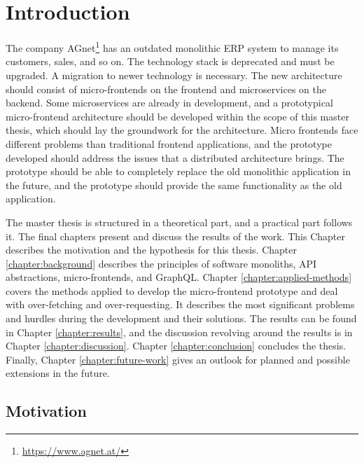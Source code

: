 \chapter{Introduction}\label{chapter:introduction}

The company AGnet\footnote{\url{https://www.agnet.at/}} has an outdated monolithic \ac{ERP} system to manage its customers, sales, and so on. The technology stack is deprecated and must be upgraded. A migration to newer technology is necessary. The new architecture should consist of micro-frontends on the frontend and microservices on the backend. Some microservices are already in development, and a prototypical micro-frontend architecture should be developed within the scope of this master thesis, which should lay the groundwork for the architecture. Micro frontends face different problems than traditional frontend applications, and the prototype developed should address the issues that a distributed architecture brings. The prototype should be able to completely replace the old monolithic application in the future, and the prototype should provide the same functionality as the old application.

\bigskip

\noindent The master thesis is structured in a theoretical part, and a practical part follows it. The final chapters present and discuss the results of the work. This Chapter describes the motivation and the hypothesis for this thesis. Chapter \ref{chapter:background} describes the principles of software monoliths, \ac{API} abstractions, micro-frontends, and GraphQL. Chapter \ref{chapter:applied-methods} covers the methods applied to develop the micro-frontend prototype and deal with over-fetching and over-requesting. It describes the most significant problems and hurdles during the development and their solutions. The results can be found in Chapter \ref{chapter:results}, and the discussion revolving around the results is in Chapter \ref{chapter:discussion}. Chapter \ref{chapter:conclusion} concludes the thesis. Finally, Chapter \ref{chapter:future-work} gives an outlook for planned and possible extensions in the future.

\section{Motivation}\label{section:introduction:motivation}

